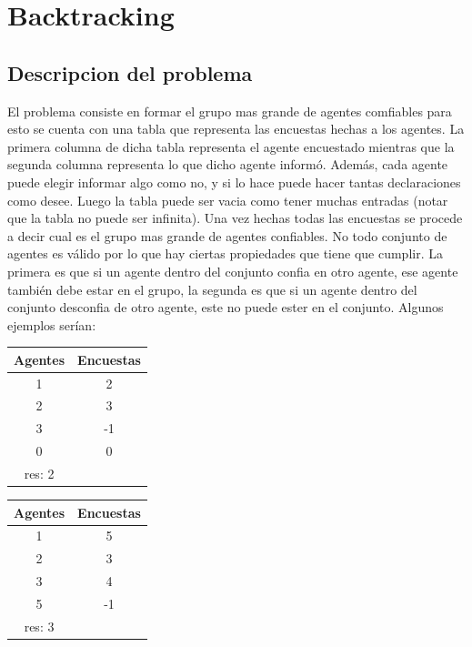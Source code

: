 \section{Backtracking}

\subsection{Descripcion del problema}

	El problema consiste en formar el grupo mas grande de agentes comfiables para esto se cuenta con una tabla que representa las encuestas hechas a los agentes. La primera columna de dicha tabla representa el agente encuestado mientras que la segunda columna representa lo que dicho agente informó. Además, cada agente puede elegir informar algo como no, y si lo hace puede hacer tantas declaraciones como desee. Luego la tabla puede ser vacia como tener muchas entradas (notar que la tabla no puede ser infinita). Una vez hechas todas las encuestas se procede a decir cual es el grupo mas grande de agentes confiables. No todo conjunto de agentes es válido por lo que hay ciertas propiedades que tiene que cumplir. La primera es que si un agente dentro del conjunto confia en otro agente, ese agente también debe estar en el grupo, la segunda es que si un agente dentro del conjunto desconfia de otro agente, este no puede ester en el conjunto. Algunos ejemplos serían:
	
\begin{table}[H]
\begin{tabular}{c c}
Agentes & Encuestas  \\ [0.5ex]
\hline
1 & 2 \\
2 & 3 \\
3 & -1 \\
0 & 0 \\ [1ex]
\hline
res: 2 \\
\end{tabular}
\end{table}

\begin{table}[h]
\begin{tabular}{c c}
\centering
Agentes & Encuestas \\ [0.5ex]
\hline
1 & 5 \\
2 & 3 \\
3 & 4 \\
5 & -1 \\ [1ex]
\hline
res: 3 \\
\end{tabular}
\end{table}

